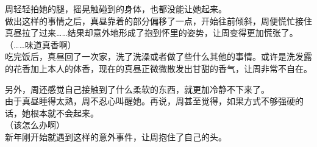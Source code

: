 周轻轻拍她的腿，摇晃触碰到的身体，也都没能让她起来。\\

做出这样的事情之后，真昼靠着的部分偏移了一点，开始往前倾斜，周便慌忙接住真昼拉了过来……结果却意外地形成了抱到怀里的姿势，让周变得更加慌张了。\\

（……味道真香啊）\\

吃完饭后，真昼回了一次家，洗了洗澡或者做了些什么其他的事情。或许是洗发露的花香加上本人的体香，现在的真昼正微微散发出甘甜的香气，让周非常不自在。

另外，周还感觉自己接触到了什么柔软的东西，就更加冷静不下来了。\\

由于真昼睡得太熟，周不忍心叫醒她。再说，周甚至觉得，如果方式不够强硬的话，她根本就不会起来。\\

（该怎么办啊）\\

新年刚开始就遇到这样的意外事件，让周抱住了自己的头。
